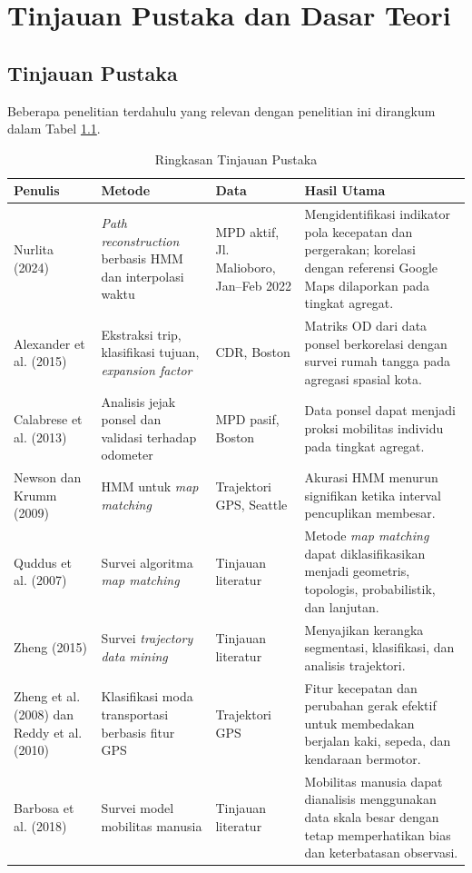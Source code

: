 \chapter{Tinjauan Pustaka dan Dasar Teori}

\section{Tinjauan Pustaka}

Beberapa penelitian terdahulu yang relevan dengan penelitian ini dirangkum dalam Tabel \ref{tab:tinjauan-pustaka}.

\begin{table}[htbp]
\centering
\caption{Ringkasan Tinjauan Pustaka}
\label{tab:tinjauan-pustaka}
\small
\begin{tabular}{p{2.5cm}p{3.2cm}p{3cm}p{4.3cm}}
\hline
Penulis & Metode & Data & Hasil Utama\\
\hline
Nurlita (2024) \cite{nurlita2024} & \textit{Path reconstruction} berbasis HMM dan interpolasi waktu & MPD aktif, Jl. Malioboro, Jan--Feb 2022 & Mengidentifikasi indikator pola kecepatan dan pergerakan; korelasi dengan referensi Google Maps dilaporkan pada tingkat agregat.\\
Alexander et al. (2015) \cite{alexander2015} & Ekstraksi trip, klasifikasi tujuan, \textit{expansion factor} & CDR, Boston & Matriks OD dari data ponsel berkorelasi dengan survei rumah tangga pada agregasi spasial kota.\\
Calabrese et al. (2013) \cite{calabrese2013} & Analisis jejak ponsel dan validasi terhadap odometer & MPD pasif, Boston & Data ponsel dapat menjadi proksi mobilitas individu pada tingkat agregat.\\
Newson dan Krumm (2009) \cite{newson2009} & HMM untuk \textit{map matching} & Trajektori GPS, Seattle & Akurasi HMM menurun signifikan ketika interval pencuplikan membesar.\\
Quddus et al. (2007) \cite{quddus2007} & Survei algoritma \textit{map matching} & Tinjauan literatur & Metode \textit{map matching} dapat diklasifikasikan menjadi geometris, topologis, probabilistik, dan lanjutan.\\
Zheng (2015) \cite{zheng2015} & Survei \textit{trajectory data mining} & Tinjauan literatur & Menyajikan kerangka segmentasi, klasifikasi, dan analisis trajektori.\\
Zheng et al. (2008) \cite{zheng2008} dan Reddy et al. (2010) \cite{reddy2010} & Klasifikasi moda transportasi berbasis fitur GPS & Trajektori GPS & Fitur kecepatan dan perubahan gerak efektif untuk membedakan berjalan kaki, sepeda, dan kendaraan bermotor.\\
Barbosa et al. (2018) \cite{barbosa2018} & Survei model mobilitas manusia & Tinjauan literatur & Mobilitas manusia dapat dianalisis menggunakan data skala besar dengan tetap memperhatikan bias dan keterbatasan observasi.\\
\hline
\end{tabular}
\end{table}

